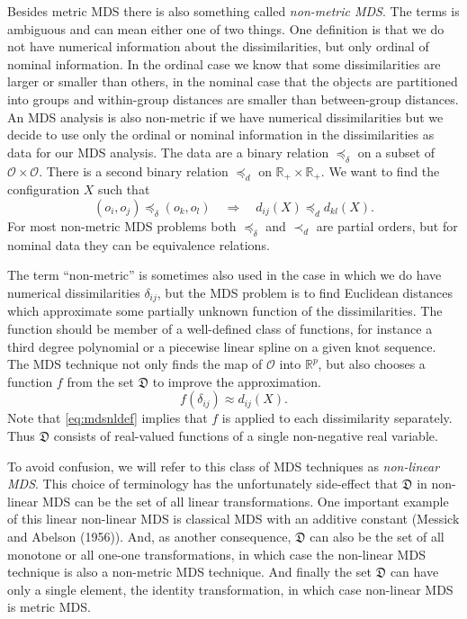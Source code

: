 \documentclass[
  12pt,
]{article}
\begin{document}
Besides metric MDS there is also something called \emph{non-metric MDS}. The terms is ambiguous and can mean either one of two things. One definition is that
we do not have numerical information about the dissimilarities, but only
ordinal of nominal information. In the ordinal case we know that some dissimilarities are larger or smaller than others, in the nominal case
that the objects are partitioned into groups and within-group
distances are smaller than between-group distances. An MDS analysis
is also non-metric if we have numerical dissimilarities but we decide
to use only the ordinal or nominal information in the dissimilarities
as data for our MDS analysis. The data are a binary relation \(\preceq_\delta\) on a subset of
\(\mathcal{O}\times\mathcal{O}\). There is a second binary relation \(\preceq_d\) on
\(\mathbb{R}_+\times\mathbb{R}_+\). We want to find the configuration \(X\)
such that
\begin{equation}
(o_i,o_j)\preceq_\delta(o_k,o_l)\quad\Rightarrow\quad d_{ij}(X)\preceq_d d_{kl}(X).
\label{eq:relations}
\end{equation}
For most non-metric MDS problems both \(\preceq_\delta\) and \(\prec_d\) are partial orders, but for nominal data they can be equivalence relations.

The term ``non-metric'' is sometimes also used in the case in which we do have numerical dissimilarities \(\delta_{ij}\), but the MDS problem is to find Euclidean distances which approximate some partially unknown function of the dissimilarities. The function should be member of a well-defined class of functions, for
instance a third degree polynomial or a piecewise linear spline on a
given knot sequence. The MDS technique not only finds the map of
\(\mathcal{O}\) into \(\mathbb{R}^p\), but also chooses a function \(f\)
from the set \(\mathfrak{D}\) to improve the approximation.
\begin{equation}
f(\delta_{ij})\approx d_{ij}(X).
\label{eq:mdsnldef}
\end{equation}
Note that \eqref{eq:mdsnldef} implies that \(f\) is applied to each
dissimilarity separately. Thus \(\mathfrak{D}\) consists of real-valued
functions of a single non-negative real variable.

To avoid confusion, we will refer to this class
of MDS techniques as \emph{non-linear MDS}. This choice of terminology
has the unfortunately side-effect that \(\mathfrak{D}\) in non-linear
MDS can be the set of all linear transformations. One important
example of this linear non-linear MDS is classical MDS with an
additive constant (Messick and Abelson (1956)). And, as another consequence, \(\mathfrak{D}\) can also be the set of all monotone or all one-one transformations, in which case the non-linear MDS technique is also a non-metric MDS technique. And finally the set \(\mathfrak{D}\) can have
only a single element, the identity transformation, in which case
non-linear MDS is metric MDS.
\end{document}
